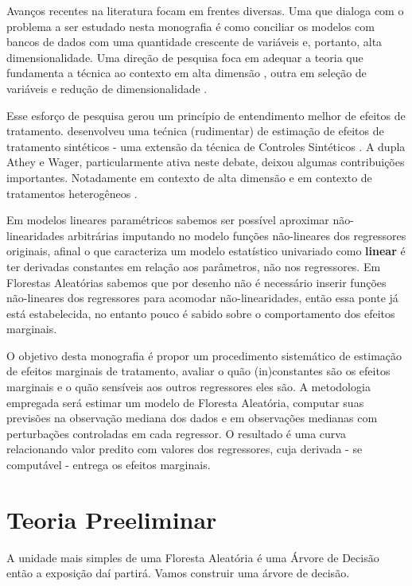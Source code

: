 Avanços recentes na literatura focam em frentes diversas. Uma que dialoga com o problema a ser estudado nesta monografia é como conciliar os modelos com bancos de dados com uma quantidade crescente de variáveis e, portanto, alta dimensionalidade. Uma direção de pesquisa foca em adequar a teoria que fundamenta a técnica ao contexto em alta dimensão \cite{athey2019generalized}, outra em seleção de variáveis e redução de dimensionalidade \cite{hastie2015statistical}. 

Esse esforço de pesquisa gerou um princípio de entendimento melhor de efeitos de tratamento.  desenvolveu uma tećnica (rudimentar) de estimação de efeitos de tratamento sintéticos - uma extensão da técnica de Controles Sintéticos \cite{abadie2010synthetic}. A dupla Athey e Wager, particularmente ativa neste debate, deixou algumas contribuições importantes. Notadamente em contexto de alta dimensão \cite{athey2018approximate} e em contexto de tratamentos heterogêneos \cite{wager2018estimation}. 

Em modelos lineares paramétricos sabemos ser possível aproximar não-linearidades arbitrárias imputando no modelo funções não-lineares dos regressores originais, afinal o que caracteriza um modelo estatístico univariado como \textbf{linear} é ter derivadas constantes em relação aos parâmetros, não nos regressores. Em Florestas Aleatórias sabemos que por desenho não é necessário inserir funções não-lineares dos regressores para acomodar não-linearidades, então essa ponte já está estabelecida, no entanto pouco é sabido sobre o comportamento dos efeitos marginais.

O objetivo desta monografia é propor um procedimento sistemático de estimação de efeitos marginais de tratamento, avaliar o quão (in)constantes são os efeitos marginais e o quão sensíveis aos outros regressores eles são. A metodologia empregada será estimar um modelo de Floresta Aleatória, computar suas previsões na observação mediana dos dados e em observações medianas com perturbações controladas em cada regressor. O resultado é uma curva relacionando valor predito com valores dos regressores, cuja derivada - se computável - entrega os efeitos marginais.

\section{Teoria Preeliminar}

A unidade mais simples de uma Floresta Aleatória é uma Árvore de Decisão \cite{breiman2017classification} então a exposição daí partirá. Vamos construir uma árvore de decisão.

